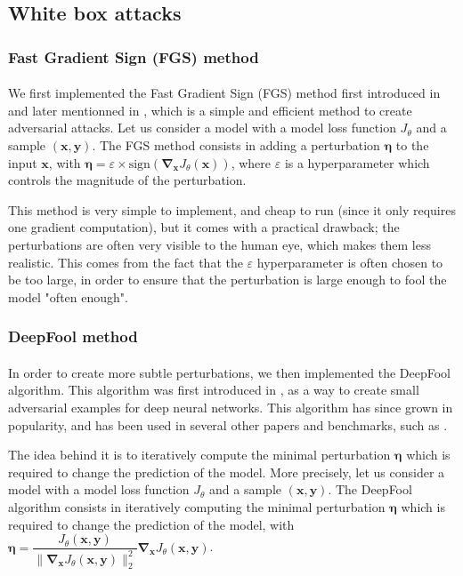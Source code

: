 \documentclass[10pt,twocolumn,letterpaper]{article}
\begin{document}
\subsection{White box attacks}

\subsubsection{Fast Gradient Sign (FGS) method}

\paragraph{} We first implemented the Fast Gradient Sign (FGS) method first introduced in \cite{fast_gradient_sign} and later mentionned in \cite{robustness}, which is a simple and efficient method to create adversarial attacks. Let us consider a model with a model loss function $J_{\theta}$ and a sample $(\bm{x}, \bm{y})$. The FGS method consists in adding a perturbation $\bm{\eta}$ to the input $\bm{x}$, with $\bm{\eta} = \varepsilon \times \text{sign}(\bm{\nabla}_{\bm{x}} J_{\theta}(\bm{x}))$, where $\varepsilon$ is a hyperparameter which controls the magnitude of the perturbation. 

This method is very simple to implement, and cheap to run (since it only requires one gradient computation), but it comes with a practical drawback; the perturbations are often very visible to the human eye, which makes them less realistic. This comes from the fact that the $\varepsilon$ hyperparameter is often chosen to be too large, in order to ensure that the perturbation is large enough to fool the model "often enough". 

\subsubsection{DeepFool method}

\paragraph{} In order to create more subtle perturbations, we then implemented the DeepFool algorithm. This algorithm was first introduced in \cite{deepfool}, as a way to create small adversarial examples for deep neural networks. This algorithm has since grown in popularity, and has been used in several other papers and benchmarks, such as \cite{robustness}.

The idea behind it is to iteratively compute the minimal perturbation $\bm{\eta}$ which is required to change the prediction of the model. More precisely, let us consider a model with a model loss function $J_{\theta}$ and a sample $(\bm{x}, \bm{y})$. The DeepFool algorithm consists in iteratively computing the minimal perturbation $\bm{\eta}$ which is required to change the prediction of the model, with $\bm{\eta} = \dfrac{J_{\theta}(\bm{x}, \bm{y})}{\|\bm{\nabla}_{\bm{x}} J_{\theta}(\bm{x}, \bm{y})\|_2^2} \bm{\nabla}_{\bm{x}} J_{\theta}(\bm{x}, \bm{y})$. 
\end{document}
